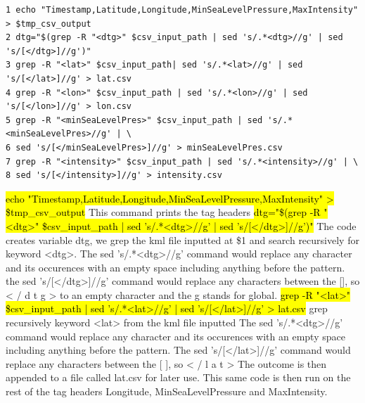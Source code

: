 \documentclass[]{article}
\begin{document}
\begin{tcolorbox}[colback=white, colframe=black, boxrule=0.5pt, arc=2mm, 
    title=Second part of the code, width=6.7in, fonttitle=\bfseries, listing only, listing options={language=sh, basicstyle=\ttfamily}]
    \begin{verbatim}
1 echo "Timestamp,Latitude,Longitude,MinSeaLevelPressure,MaxIntensity" > $tmp_csv_output
2 dtg="$(grep -R "<dtg>" $csv_input_path | sed 's/.*<dtg>//g' | sed 's/[</dtg>]//g')"
3 grep -R "<lat>" $csv_input_path| sed 's/.*<lat>//g' | sed 's/[</lat>]//g' > lat.csv
4 grep -R "<lon>" $csv_input_path | sed 's/.*<lon>//g' | sed 's/[</lon>]//g' > lon.csv
5 grep -R "<minSeaLevelPres>" $csv_input_path | sed 's/.*<minSeaLevelPres>//g' | \
6 sed 's/[</minSeaLevelPres>]//g' > minSeaLevelPres.csv
7 grep -R "<intensity>" $csv_input_path | sed 's/.*<intensity>//g' | \ 
8 sed 's/[</intensity>]//g' > intensity.csv
    \end{verbatim}
\hl{echo "Timestamp,Latitude,Longitude,MinSeaLevelPressure,MaxIntensity" > \$tmp\_csv\_output}\newline
This command prints the tag headers\newline
\hl{dtg="\$(grep -R "<dtg>" \$csv\_input\_path | sed 's/.*<dtg>//g' | sed 's/[</dtg>]//g')"}\newline
The code creates variable dtg, we grep the kml file inputted at \$1 and search recursively for\newline
keyword <dtg>. The sed 's/.*<dtg>//g' command would replace any character and its occurences \newline
with an empty space including anything before the pattern.\newline
the sed 's/[</dtg>]//g' command would replace any characters between the [], so < / d t g >\newline
to an empty character and the g stands for global.\newline
\hl{grep -R "<lat>" \$csv\_input\_path | sed 's/.*<lat>//g' | sed 's/[</lat>]//g' > lat.csv}\newline
grep recursively keyword <lat> from the kml file inputted\newline
The sed 's/.*<dtg>//g' command would replace any character and its occurences \newline
with an empty space including anything before the pattern.\newline
The sed 's/[</lat>]//g' command would replace any characters between the [ ], so < / l a t >\newline
The outcome is then appended to a file called lat.csv for later use. This same code is then run\newline
on the rest of the tag headers Longitude, MinSeaLevelPressure and MaxIntensity.\newline


\end{tcolorbox}
\end{document}
